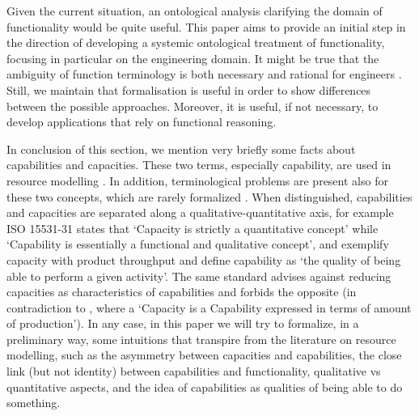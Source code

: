 \documentclass[sw]{iosart2x}
\newcommand{\quotes}[1]{`#1'}
\newcommand{\TODO}[1]{{%
}}
\begin{document}
Given the current situation, an ontological analysis clarifying the domain of functionality would be quite useful.
This paper aims to provide an initial step in the direction of developing a systemic ontological treatment of functionality, focusing in particular on the engineering domain.
It might be true that the ambiguity of function terminology is both necessary and rational for engineers \cite{vermaasConceptualElusivenessEngineering2012}. 
Still, we maintain that formalisation is useful in order to show differences between the possible approaches. Moreover, it is useful, if not necessary, to develop applications that rely on functional reasoning.

\medskip
In conclusion of this section, we mention very briefly some facts about capabilities and capacities. 
These two terms, especially capability, are used in resource modelling \cite{jarvenpaaDevelopmentOntologyDescribing2019a, sarkarOntologyModelProcess2019, jochemISOISO15531312004, solanoKnowledgeRepresentationProduct2014}. In addition, terminological problems are present also for these two concepts, which are rarely formalized \cite{sanfilippoResourcesManufacturing2015, borgoCapabilitiesCapacitiesFunctionalities2021}. When distinguished, capabilities and capacities are separated along a qualitative-quantitative axis, for example ISO 15531-31\cite{jochemISOISO15531312004} states that \quotes{Capacity is strictly a quantitative concept} while \quotes{Capability is essentially a functional and qualitative concept}, and exemplify capacity with product throughput and define capability as \quotes{the quality of being able to perform a given activity}. The same standard advises against reducing capacities as characteristics of capabilities and forbids the opposite (in contradiction to \cite{solanoKnowledgeRepresentationProduct2014}, where a \quotes{Capacity is a Capability
expressed in terms of amount of production}).
In any case, in this paper we will try to formalize, in a preliminary way, some intuitions that transpire from the literature on resource modelling, such as the asymmetry between capacities and capabilities, the close link (but not identity) between capabilities and functionality, qualitative vs quantitative aspects, and the idea of capabilities as qualities of being able to do something.
\end{document}
